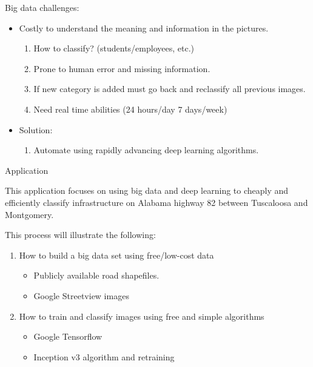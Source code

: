 \documentclass[ignorenonframetext,]{beamer}
\providecommand{\tightlist}{%
  \setlength{\itemsep}{0pt}\setlength{\parskip}{0pt}}
\begin{document}
\begin{frame}{Big data challenges:}

\begin{itemize}
\tightlist
\item
  Costly to understand the meaning and information in the pictures.

  \begin{enumerate}
  \def\labelenumi{\arabic{enumi}.}
  \tightlist
  \item
    How to classify? (students/employees, etc.)
  \item
    Prone to human error and missing information.
  \item
    If new category is added must go back and reclassify all previous
    images.
  \item
    Need real time abilities (24 hours/day 7 days/week)
  \end{enumerate}
\item
  Solution:

  \begin{enumerate}
  \def\labelenumi{\arabic{enumi}.}
  \tightlist
  \item
    Automate using rapidly advancing deep learning algorithms.
  \end{enumerate}
\end{itemize}

\end{frame}

\begin{frame}{Application}

This application focuses on using big data and deep learning to cheaply
and efficiently classify infrastructure on Alabama highway 82 between
Tuscaloosa and Montgomery.

This process will illustrate the following:

\begin{enumerate}
\def\labelenumi{\arabic{enumi}.}
\tightlist
\item
  How to build a big data set using free/low-cost data

  \begin{itemize}
  \tightlist
  \item
    Publicly available road shapefiles.
  \item
    Google Streetview images
  \end{itemize}
\item
  How to train and classify images using free and simple algorithms

  \begin{itemize}
  \tightlist
  \item
    Google Tensorflow
  \item
    Inception v3 algorithm and retraining
  \end{itemize}
\end{enumerate}

\end{frame}
\end{document}
